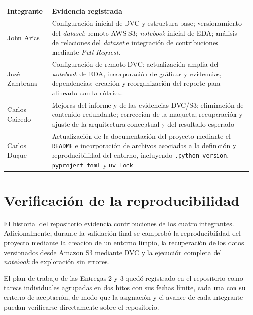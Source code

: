 \documentclass[11pt]{article}
\begin{document}
\begin{table}[h!]
\centering
\small
\begin{tabular}{p{3.0cm} p{11.5cm}}
\toprule
\textbf{Integrante} & \textbf{Evidencia registrada} \\
\midrule
John Arias &
Configuración inicial de DVC y estructura base; versionamiento del
\textit{dataset}; remoto AWS S3; \textit{notebook} inicial de EDA; análisis de
relaciones del \textit{dataset} e integración de contribuciones mediante
\textit{Pull Request}. \\[3pt]

José Zambrana &
Configuración de remoto DVC; actualización amplia del \textit{notebook} de EDA;
incorporación de gráficas y evidencias; dependencias; creación y reorganización
del reporte para alinearlo con la rúbrica. \\[3pt]

Carlos Caicedo &
Mejoras del informe y de las evidencias DVC/S3; eliminación de contenido
redundante; corrección de la maqueta; recuperación y ajuste de la arquitectura
conceptual y del resultado esperado. \\[3pt]

Carlos Duque &
Actualización de la documentación del proyecto mediante el \texttt{README} e
incorporación de archivos asociados a la definición y reproducibilidad del
entorno, incluyendo \texttt{.python-version}, \texttt{pyproject.toml} y
\texttt{uv.lock}. \\
\bottomrule
\end{tabular}
\end{table}

\section{Verificación de la reproducibilidad}

El historial del repositorio evidencia contribuciones de los cuatro integrantes.
Adicionalmente, durante la validación final se comprobó la reproducibilidad del
proyecto mediante la creación de un entorno limpio, la recuperación de los datos
versionados desde Amazon S3 mediante DVC y la ejecución completa del
\textit{notebook} de exploración sin errores.

El plan de trabajo de las Entregas 2 y 3 quedó registrado en el repositorio como
tareas individuales agrupadas en dos hitos con sus fechas límite, cada una con su
criterio de aceptación, de modo que la asignación y el avance de cada integrante
puedan verificarse directamente sobre el repositorio.
\end{document}
